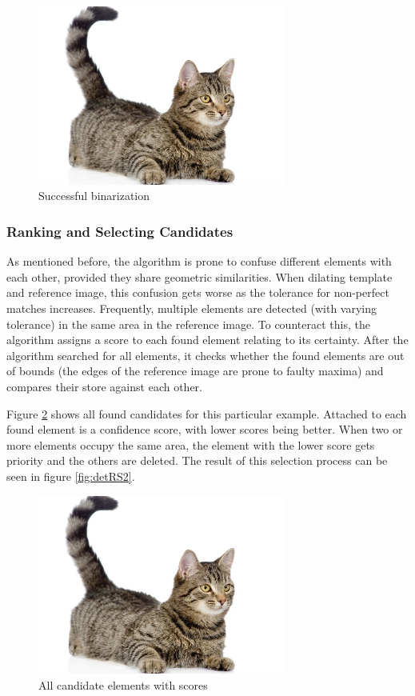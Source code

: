 \documentclass[10pt,twocolumn,letterpaper]{article}
\begin{document}
\begin{figure}[!ht]
\includegraphics[width = 3.2in]{img/cat.jpg}
\caption{Successful binarization}
\label{fig:detMX3}
\end{figure}

\subsubsection*{Ranking and Selecting Candidates}

As mentioned before, the algorithm is prone to confuse different elements with each other, provided they share geometric similarities. When dilating template and reference image, this confusion gets worse as the tolerance for non-perfect matches increases. Frequently, multiple elements are detected (with varying tolerance) in the same area in the reference image. To counteract this, the algorithm assigns a score to each found element relating to its certainty. After the algorithm searched for all elements, it checks whether the found elements are out of bounds (the edges of the reference image are prone to faulty maxima) and compares their store against each other. 
\par
Figure \ref{fig:detRS1} shows all found candidates for this particular example. Attached to each found element is a confidence score, with lower scores being better. When two or more elements occupy the same area, the element with the lower score gets priority and the others are deleted. The result of this selection process can be seen in figure \ref{fig:detRS2}.

\begin{figure}[!ht]
\includegraphics[width = 3.2in]{img/cat.jpg}
\caption{All candidate elements with scores}
\label{fig:detRS1}
\end{figure}
\par
\end{document}
